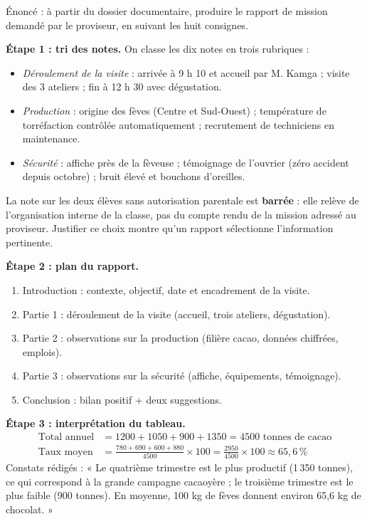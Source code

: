 \documentclass[11pt]{article}
\begin{document}
\begin{exoresolu}
Énoncé : à partir du dossier documentaire, produire le rapport de mission demandé par le proviseur, en suivant les huit consignes.

\tcblower

\textbf{Étape 1 : tri des notes.} On classe les dix notes en trois rubriques :
\begin{itemize}
\item \emph{Déroulement de la visite} : arrivée à 9 h 10 et accueil par M. Kamga ; visite des 3 ateliers ; fin à 12 h 30 avec dégustation.
\item \emph{Production} : origine des fèves (Centre et Sud-Ouest) ; température de torréfaction contrôlée automatiquement ; recrutement de techniciens en maintenance.
\item \emph{Sécurité} : affiche près de la fèveuse ; témoignage de l'ouvrier (zéro accident depuis octobre) ; bruit élevé et bouchons d'oreilles.
\end{itemize}
La note sur les deux élèves sans autorisation parentale est \textbf{barrée} : elle relève de l'organisation interne de la classe, pas du compte rendu de la mission adressé au proviseur. Justifier ce choix montre qu'un rapport sélectionne l'information pertinente.

\textbf{Étape 2 : plan du rapport.}
\begin{enumerate}
\item Introduction : contexte, objectif, date et encadrement de la visite.
\item Partie 1 : déroulement de la visite (accueil, trois ateliers, dégustation).
\item Partie 2 : observations sur la production (filière cacao, données chiffrées, emplois).
\item Partie 3 : observations sur la sécurité (affiche, équipements, témoignage).
\item Conclusion : bilan positif + deux suggestions.
\end{enumerate}

\textbf{Étape 3 : interprétation du tableau.}
\begin{align*}
\text{Total annuel} &= 1200 + 1050 + 900 + 1350 = 4500 \text{ tonnes de cacao}\\
\text{Taux moyen} &= \frac{780+690+600+880}{4500} \times 100 = \frac{2950}{4500} \times 100 \approx 65{,}6\,\%
\end{align*}
Constats rédigés : « Le quatrième trimestre est le plus productif (1\,350 tonnes), ce qui correspond à la grande campagne cacaoyère ; le troisième trimestre est le plus faible (900 tonnes). En moyenne, 100 kg de fèves donnent environ 65,6 kg de chocolat. »


\end{exoresolu}
\end{document}
